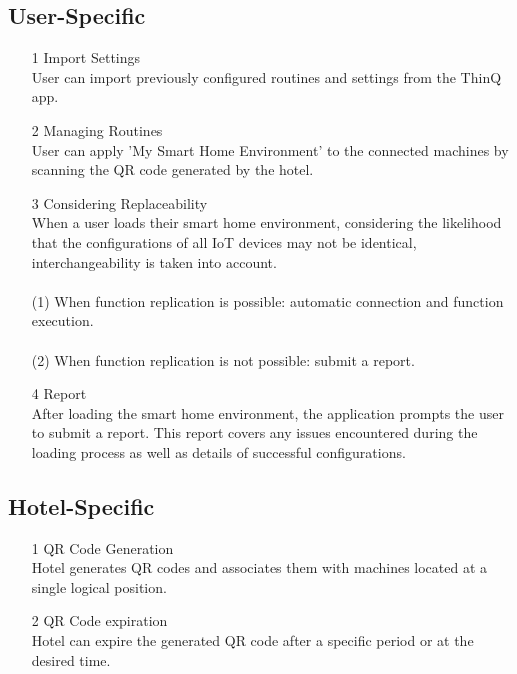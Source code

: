 \documentclass[conference]{IEEEtran}
\begin{document}
\subsection{User-Specific}
\begin{enumerate}
\item[1] Import Settings \\ 
User can import previously configured routines and settings from the ThinQ app. \\
\item[2] Managing Routines\\
User can apply 'My Smart Home Environment' to the connected machines by scanning the QR code generated by the hotel.
\\
\item[3] Considering Replaceability\\
When a user loads their smart home environment, considering the likelihood that the configurations of all IoT devices may not be identical, interchangeability is taken into account.
\\\\
(1) When function replication is possible: automatic connection and function execution.\\\\
(2) When function replication is not possible: submit a report.
\\

\item[4] Report\\
After loading the smart home environment, the application prompts the user to submit a report. This report covers any issues encountered during the loading process as well as details of successful configurations.
\\
\end{enumerate}

\subsection{Hotel-Specific}
\begin{enumerate}
\item[1] QR Code Generation\\ 
Hotel generates QR codes and associates them with machines located at a single logical position.\\
\item[2] QR Code expiration\\
Hotel can expire the generated QR code after a specific period or at the desired time.\\
\end{enumerate}
\end{document}
